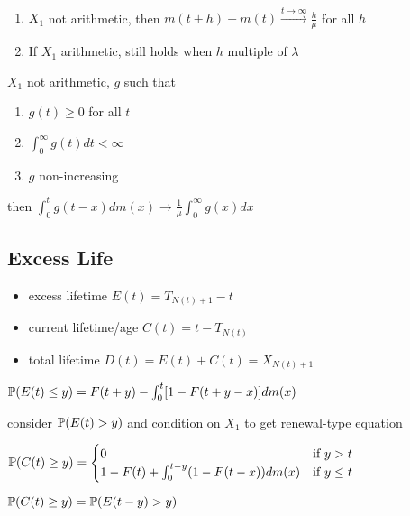 \begin{thm}\,
    \begin{enumerate}
        \item $X_1$ not arithmetic, then $m(t + h) - m(t) \xrightarrow{t\rightarrow\infty} \frac{h}{\mu}$ for all $h$
        \item If $X_1$ arithmetic, still holds when $h$ multiple of $\lambda$
    \end{enumerate}
\end{thm}

\begin{thm}
    $X_1$ not arithmetic, $g$ such that
    \begin{enumerate}
        \item $g(t) \geq 0$ for all $t$
        \item $\int_0^\infty g(t)dt < \infty$
        \item $g$ non-increasing
    \end{enumerate}
    then $\int_0^t g(t-x) dm(x) \rightarrow \frac{1}{\mu} \int_0^\infty g(x) dx$
\end{thm}

\subsection{Excess Life}\label{subsec:excess-life}

\begin{itemize}
    \item excess lifetime $E(t) = T_{N(t)+1} - t$
    \item current lifetime/age $C(t) = t - T_{N(t)}$
    \item total lifetime $D(t) = E(t) + C(t) = X_{N(t) + 1}$
\end{itemize}

\begin{thm}
    $\mathbb{P}(E(t) \leq y) = F(t + y) - \int_0^t [1 - F(t + y - x)]dm(x)$
\end{thm}
\begin{pf}
    consider $\mathbb{P}(E(t) > y)$ and condition on $X_1$ to get renewal-type equation
\end{pf}

\begin{cor}
    $\mathbb{P}(C(t) \geq y) =
    \begin{cases}
        0 & \text{if } y > t\\
        1 - F(t) + \int_0^{t-y}(1 - F(t-x))dm(x) &\text{if } y \leq t
    \end{cases}$
\end{cor}
\begin{pf}
    $\mathbb{P}(C(t) \geq y) = \mathbb{P}(E(t -y) > y)$
\end{pf}

